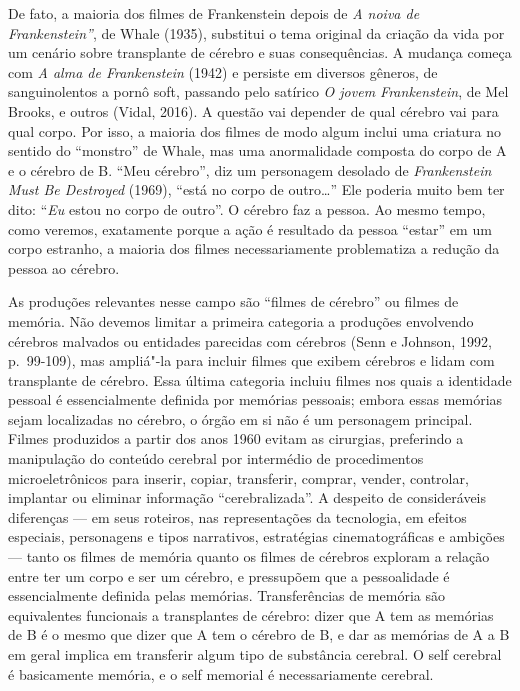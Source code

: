 De fato, a maioria dos filmes de Frankenstein depois de \emph{A noiva de
Frankenstein''}, de Whale (1935), substitui o tema original da criação
da vida por um cenário sobre transplante de cérebro e suas
consequências. A mudança começa com \emph{A alma de Frankenstein} (1942)
e persiste em diversos gêneros, de sanguinolentos a pornô soft, passando
pelo satírico \emph{O jovem Frankenstein}, de Mel Brooks, e outros
(Vidal, 2016). A questão vai depender de qual cérebro vai para qual
corpo. Por isso, a maioria dos filmes de modo algum inclui uma criatura
no sentido do ``monstro'' de Whale, mas uma anormalidade composta do
corpo de A e o cérebro de B. ``Meu cérebro'', diz um personagem desolado
de \emph{Frankenstein Must Be Destroyed} (1969), ``está no corpo de
outro\ldots{}'' Ele poderia muito bem ter dito: ``\emph{Eu} estou no corpo de
outro''. O cérebro faz a pessoa. Ao mesmo tempo, como veremos,
exatamente porque a ação é resultado da pessoa ``estar'' em um corpo
estranho, a maioria dos filmes necessariamente problematiza a redução da
pessoa ao cérebro.

As produções relevantes nesse campo são ``filmes de cérebro'' ou filmes
de memória. Não devemos limitar a primeira categoria a produções
envolvendo cérebros malvados ou entidades parecidas com cérebros (Senn e
Johnson, 1992, p.~99-109), mas ampliá"-la para incluir filmes que exibem
cérebros e lidam com transplante de cérebro. Essa última categoria
incluiu filmes nos quais a identidade pessoal é essencialmente definida
por memórias pessoais; embora essas memórias sejam localizadas no
cérebro, o órgão em si não é um personagem principal. Filmes produzidos
a partir dos anos 1960 evitam as cirurgias, preferindo a manipulação do
conteúdo cerebral por intermédio de procedimentos microeletrônicos para
inserir, copiar, transferir, comprar, vender, controlar, implantar ou
eliminar informação ``cerebralizada''. A despeito de consideráveis
diferenças --- em seus roteiros, nas representações da tecnologia, em
efeitos especiais, personagens e tipos narrativos, estratégias
cinematográficas e ambições --- tanto os filmes de memória quanto os
filmes de cérebros exploram a relação entre ter um corpo e ser um
cérebro, e pressupõem que a pessoalidade é essencialmente definida pelas
memórias. Transferências de memória são equivalentes funcionais a
transplantes de cérebro: dizer que A tem as memórias de B é o mesmo que
dizer que A tem o cérebro de B, e dar as memórias de A a B em geral
implica em transferir algum tipo de substância cerebral. O self cerebral
é basicamente memória, e o self memorial é necessariamente cerebral.

